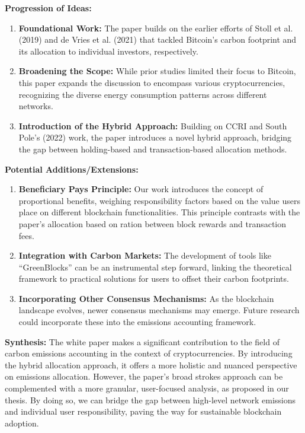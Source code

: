 \documentclass{article}
\begin{document}
\textbf{Progression of Ideas:}
\begin{enumerate}
    \item \textbf{Foundational Work:} The paper builds on the earlier efforts of Stoll et al. (2019) and de Vries et al. (2021) that tackled Bitcoin's carbon footprint and its allocation to individual investors, respectively.
    \item \textbf{Broadening the Scope:} While prior studies limited their focus to Bitcoin, this paper expands the discussion to encompass various cryptocurrencies, recognizing the diverse energy consumption patterns across different networks.
    \item \textbf{Introduction of the Hybrid Approach:} Building on CCRI and South Pole's (2022) work, the paper introduces a novel hybrid approach, bridging the gap between holding-based and transaction-based allocation methods.
\end{enumerate}

\textbf{Potential Additions/Extensions:}
\begin{enumerate}
    \item \textbf{Beneficiary Pays Principle:} Our work introduces the concept of proportional benefits, weighing responsibility factors based on the value users place on different blockchain functionalities. This principle contrasts with the paper's allocation based on ration between block rewards and transaction fees.

    \item \textbf{Integration with Carbon Markets:} The development of tools like ``GreenBlocks'' can be an instrumental step forward, linking the theoretical framework to practical solutions for users to offset their carbon footprints.
    \item \textbf{Incorporating Other Consensus Mechanisms:} As the blockchain landscape evolves, newer consensus mechanisms may emerge. Future research could incorporate these into the emissions accounting framework.
\end{enumerate}

\textbf{Synthesis:}
The white paper makes a significant contribution to the field of carbon emissions accounting in the context of cryptocurrencies. By introducing the hybrid allocation approach, it offers a more holistic and nuanced perspective on emissions allocation. However, the paper's broad strokes approach can be complemented with a more granular, user-focused analysis, as proposed in our thesis. By doing so, we can bridge the gap between high-level network emissions and individual user responsibility, paving the way for sustainable blockchain adoption.




\end{document}
